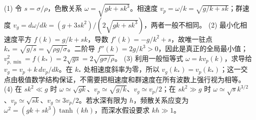 (1) 令 \(s=\sigma/\rho\)，色散关系 \(\omega=\sqrt{gk+sk^3}\)。相速度 \(v_p=\omega/k=\sqrt{g/k+sk}\)；群速度 \(v_g=d\omega/dk=(g+3sk^2)/(2\sqrt{gk+sk^3})\)，两者一般不相同。
(2) 最小化相速度平方 \(f(k)=g/k+sk\)，导数 \(f'(k)=-g/k^2+s\)，故唯一驻点 \(k_*=\sqrt{g/s}=\sqrt{\rho g/\sigma}\)。二阶导 \(f''(k)=2g/k^3>0\)，因此是真正的全局最小值；\(v_{p,\min}^2=f(k_*)=2\sqrt{gs}=2\sqrt{g\sigma/\rho}\)。
(3) 利用一般恒等式 \(\omega=kv_p(k)\)，求导给 \(v_g=v_p+k\,dv_p/dk\)。在 \(k_*\) 处相速度斜率为零，所以 \(v_g(k_*)=v_p(k_*)\)；这一交点由极值数学结构保证，不需要把相速度和群速度在所有波数上强行视为相等。
(4) 在 \(sk^2\ll g\) 时 \(\omega\simeq\sqrt{gk}\)、\(v_p\simeq\sqrt{g/k}\)、\(v_g\simeq v_p/2\)；在 \(sk^2\gg g\) 时 \(\omega\simeq\sqrt{s}k^{3/2}\)、\(v_p\simeq\sqrt{sk}\)、\(v_g\simeq3v_p/2\)。若水深有限为 \(h\)，频散关系应变为 \(\omega^2=(gk+sk^3)\tanh(kh)\)，而深水假设要求 \(kh\gg1\)。
